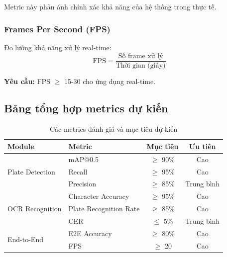 Metric này phản ánh chính xác khả năng của hệ thống trong thực tế.

\subsubsection{Frames Per Second (FPS)}
Đo lường khả năng xử lý real-time:
\begin{equation}
    \text{FPS} = \frac{\text{Số frame xử lý}}{\text{Thời gian (giây)}}
\end{equation}

\textbf{Yêu cầu:} FPS $\geq$ 15-30 cho ứng dụng real-time.

\subsection{Bảng tổng hợp metrics dự kiến}

\begin{table}[!ht]
\centering
\caption{Các metrics đánh giá và mục tiêu dự kiến}
\label{tab:alpr_metrics_target}
\begin{tabular}{|l|l|c|c|}
\hline
\textbf{Module} & \textbf{Metric} & \textbf{Mục tiêu} & \textbf{Ưu tiên} \\ \hline
\multirow{3}{*}{Plate Detection} & mAP@0.5 & $\geq$ 90\% & Cao \\ \cline{2-4}
 & Recall & $\geq$ 95\% & Cao \\ \cline{2-4}
 & Precision & $\geq$ 85\% & Trung bình \\ \hline
\multirow{3}{*}{OCR Recognition} & Character Accuracy & $\geq$ 95\% & Cao \\ \cline{2-4}
 & Plate Recognition Rate & $\geq$ 85\% & Cao \\ \cline{2-4}
 & CER & $\leq$ 5\% & Trung bình \\ \hline
\multirow{2}{*}{End-to-End} & E2E Accuracy & $\geq$ 80\% & Cao \\ \cline{2-4}
 & FPS & $\geq$ 20 & Cao \\ \hline
\end{tabular}
\end{table}